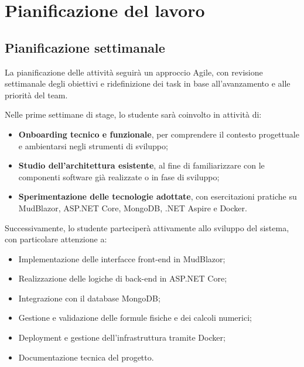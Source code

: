 
\section*{Pianificazione del lavoro}

\subsection*{Pianificazione settimanale}

La pianificazione delle attività seguirà un approccio Agile, con revisione settimanale degli obiettivi e ridefinizione dei task in base all’avanzamento e alle priorità del team.

Nelle prime settimane di stage, lo studente sarà coinvolto in attività di:
\begin{itemize}
    \item \textbf{Onboarding tecnico e funzionale}, per comprendere il contesto progettuale e ambientarsi negli strumenti di sviluppo;
    \item \textbf{Studio dell’architettura esistente}, al fine di familiarizzare con le componenti software già realizzate o in fase di sviluppo;
    \item \textbf{Sperimentazione delle tecnologie adottate}, con esercitazioni pratiche su MudBlazor, ASP.NET Core, MongoDB, .NET Aspire e Docker.
\end{itemize}

Successivamente, lo studente parteciperà attivamente allo sviluppo del sistema, con particolare attenzione a:
\begin{itemize}
    \item Implementazione delle interfacce front-end in MudBlazor;
    \item Realizzazione delle logiche di back-end in ASP.NET Core;
    \item Integrazione con il database MongoDB;
    \item Gestione e validazione delle formule fisiche e dei calcoli numerici;
    \item Deployment e gestione dell’infrastruttura tramite Docker;
    \item Documentazione tecnica del progetto.
\end{itemize}


